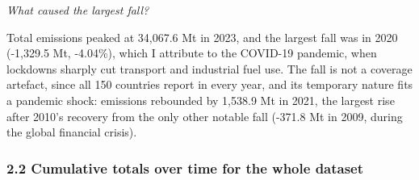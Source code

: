 \documentclass[
]{article}
\begin{document}
\emph{What caused the largest fall?}

Total emissions peaked at 34,067.6 Mt in 2023, and the largest fall was
in 2020 (-1,329.5 Mt, -4.04\%), which I attribute to the COVID-19
pandemic, when lockdowns sharply cut transport and industrial fuel use.
The fall is not a coverage artefact, since all 150 countries report in
every year, and its temporary nature fits a pandemic shock: emissions
rebounded by 1,538.9 Mt in 2021, the largest rise after 2010's recovery
from the only other notable fall (-371.8 Mt in 2009, during the global
financial crisis).

\subsubsection{2.2 Cumulative totals over time for the whole
dataset}\label{cumulative-totals-over-time-for-the-whole-dataset}
\end{document}
